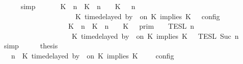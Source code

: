 \begin{isabellebody}
\ \ \ \ \isamarkupfalse%
\ simp\isanewline
\ \ \isamarkupfalse%
\ \isamarkupfalse%
\ {\isacartoucheopen}{\isasymlbrakk}\ {\isacharparenleft}{\isacharparenleft}K\ {\isasymUp}\ n{\isacharparenright}\ {\isacharhash}\ {\isacharparenleft}K\ {\isacharat}\ n\ {\isasymoplus}\ {\isasymdelta}{\isasymtau}\ {\isasymRightarrow}\ K\ {\isacharhash}\ {\isasymGamma}{\isacharparenright}{\isacharcomma}\ n\isanewline
\ \ \ \ \ \ \ \ \ \ \ \ \ \ \ \ \ \ {\isasymturnstile}\ {\isasymPsi}\ {\isasymtriangleright}\ {\isacharparenleft}{\isacharparenleft}K\ time{\isacharminus}delayed\ by\ {\isasymdelta}{\isasymtau}\ on\ K\ implies\ K\ {\isacharhash}\ {\isasymPhi}{\isacharparenright}\ {\isasymrbrakk}\isactrlsub c\isactrlsub o\isactrlsub n\isactrlsub f\isactrlsub i\isactrlsub g\isanewline
\ \ \ \ \ \ \ \ \ \ \ \ \ \ \ \ \ {\isacharequal}\ {\isasymlbrakk}{\isasymlbrakk}\ {\isacharparenleft}K\ {\isasymUp}\ n{\isacharparenright}\ {\isacharhash}\ {\isacharparenleft}K\ {\isacharat}\ n\ {\isasymoplus}\ {\isasymdelta}{\isasymtau}\ {\isasymRightarrow}\ K\ {\isacharhash}\ {\isasymGamma}\ {\isasymrbrakk}{\isasymrbrakk}\isactrlsub p\isactrlsub r\isactrlsub i\isactrlsub m\ {\isasyminter}\ {\isasymlbrakk}{\isasymlbrakk}\ {\isasymPsi}\ {\isasymrbrakk}{\isasymrbrakk}\isactrlsub T\isactrlsub E\isactrlsub S\isactrlsub L\isactrlbsup {\isasymge}\ n\isactrlesup \isanewline
\ \ \ \ \ \ \ \ \ \ \ \ \ \ \ \ \ \ {\isasyminter}\ {\isasymlbrakk}{\isasymlbrakk}\ {\isacharparenleft}K\ time{\isacharminus}delayed\ by\ {\isasymdelta}{\isasymtau}\ on\ K\ implies\ K\ {\isacharhash}\ {\isasymPhi}\ {\isasymrbrakk}{\isasymrbrakk}\isactrlsub T\isactrlsub E\isactrlsub S\isactrlsub L\isactrlbsup {\isasymge}\ Suc\ n\isactrlesup {\isacartoucheclose}\isanewline
\ \ \ \ \isamarkupfalse%
\ simp\isanewline
\ \ \isamarkupfalse%
\ \isamarkupfalse%
\ {\isacharquery}thesis\isanewline
\ \ \isamarkupfalse%
\ {\isacharminus}\isanewline
\ \ \ \ \isamarkupfalse%
\ {\isacartoucheopen}{\isasymlbrakk}\ {\isasymGamma}{\isacharcomma}\ n\ {\isasymturnstile}\ {\isacharparenleft}K\ time{\isacharminus}delayed\ by\ {\isasymdelta}{\isasymtau}\ on\ K\ implies\ K\ {\isacharhash}\ {\isasymPsi}\ {\isasymtriangleright}\ {\isasymPhi}\ {\isasymrbrakk}\isactrlsub c\isactrlsub o\isactrlsub n\isactrlsub f\isactrlsub i\isactrlsub g\isanewline

\end{isabellebody}
